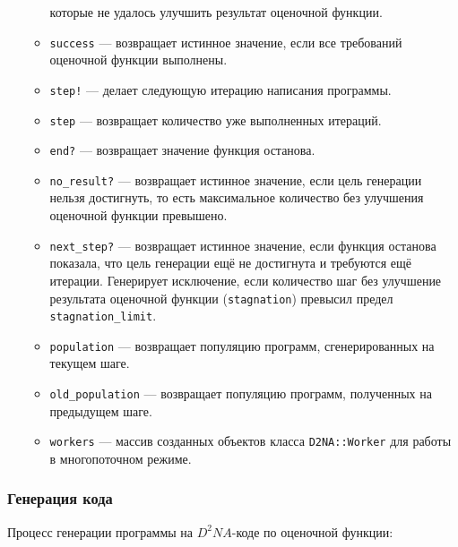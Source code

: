 \documentclass[utf8,a5paper,portrait,10pt]{eskdtext}
\begin{document}
\begin{itemize}
\begin{itemize}
                которые не удалось улучшить результат оценочной функции.
          \item \texttt{success} — возвращает истинное значение, если все
                требований оценочной функции выполнены.
          \item \texttt{step!} — делает следующую итерацию написания программы.
          \item \texttt{step} — возвращает количество уже выполненных итераций.
          \item \texttt{end?} — возвращает значение функция останова.
          \item \texttt{no\_result?} — возвращает истинное значение, если
                цель генерации нельзя достигнуть, то есть максимальное
                количество без улучшения оценочной функции превышено.
          \item \texttt{next\_step?} — возвращает истинное значение, если
                функция останова показала, что цель генерации ещё не достигнута
                и требуются ещё итерации. Генерирует исключение, если количество
                шаг без улучшение результата оценочной функции
                (\texttt{stagnation}) превысил предел\\
                \texttt{stagnation\_limit}.
          \item \texttt{population} — возвращает популяцию программ,
                сгенерированных на текущем шаге.
          \item \texttt{old\_population} — возвращает популяцию программ,
                полученных на предыдущем шаге.
          \item \texttt{workers} — массив созданных объектов класса
                \texttt{D2NA::Worker} для работы в многопоточном режиме.
        \end{itemize}
\end{itemize}

\newpage
\subsubsection{Генерация кода}

Процесс генерации программы на $D^2NA$-коде по оценочной функции:
\end{document}
